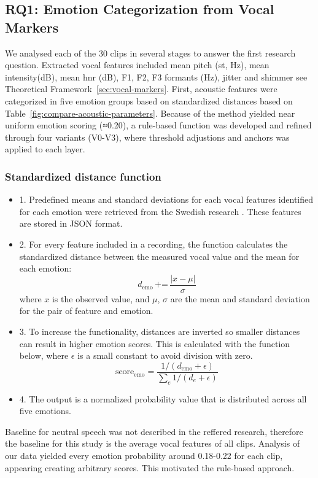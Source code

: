 \subsection{RQ1: Emotion Categorization from Vocal Markers}
\label{sec:method-data-an-voc}
We analysed each of the 30 clips in several stages to answer the first research question. Extracted vocal features included mean pitch (st, Hz), mean intensity(dB), mean hnr (dB), F1, F2, F3 formants (Hz), jitter and shimmer see Theoretical Framework~\ref{sec:vocal-markers}.
First, acoustic features were categorized in five emotion groups based on standardized distances based on Table~\ref{fig:compare-acoustic-parameters}. Because of the method yielded near uniform emotion scoring (≈0.20), a rule-based function was developed and refined through four variants (V0-V3), 
where threshold adjustions and anchors was applied to each layer. 

\subsubsection{Standardized distance function}
\label{sec:method-stand-func}
\begin{itemize}
    \item 1. Predefined means and standard deviations for each vocal features identified for each emotion were retrieved from the Swedish research \autocite{Ekberg2023}. These features are stored in JSON format. 
    \item 2. For every feature included in a recording, the function calculates the standardized distance between the measured vocal value and the mean for each emotion: 
    \[
    d_{\text{emo}} \, \text{+=} \, \frac{|x - \mu|}{\sigma}
    \]
    where \( x \) is the observed value, and \( \mu \), \( \sigma \) are the mean and standard deviation for the pair of feature and emotion.  
    \item 3. To increase the functionality, distances are inverted so smaller distances can result in higher emotion scores. 
    This is calculated with the function below, where \( \epsilon \) is a small constant to avoid division with zero. 
    \[
    \text{score}_{\text{emo}} = \frac{1 / (d_{\text{emo}} + \epsilon)}{\sum_{e} 1 / (d_{e} + \epsilon)}
    \]
    \item 4. The output is a normalized probability value that is distributed across all five emotions. 
\end{itemize}
Baseline for neutral speech was not described in the reffered research, therefore the baseline for this study is the average vocal features of all clips. 
Analysis of our data yielded every emotion probability around 0.18-0.22 for each clip, appearing creating arbitrary scores. This motivated the rule-based approach. 

